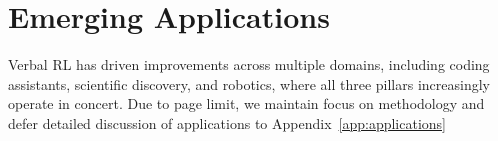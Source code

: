 


\section{Emerging Applications}
Verbal RL has driven improvements across multiple domains, including coding assistants, scientific discovery, and robotics, where all three pillars increasingly operate in concert. Due to page limit, we maintain focus on methodology and defer detailed discussion of applications to Appendix~\ref{app:applications} 


